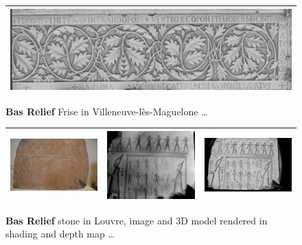 \begin{figure}
\begin{tabular}{||c|c|c|c||}
   \multicolumn{4}{|c|}{\vspace{2mm} \includegraphics[width=160mm]{FIGS/SAMPLES/FrisScaledShade.jpg}} \\ \hline  \hline
\end{tabular}
\caption{{\bf Bas Relief} Frise in Villeneuve-lès-Maguelone \dots}
\end{figure}


\begin{figure}
\begin{tabular}{||c|c|c||}
   \hline \hline
   \includegraphics[width=52mm]{FIGS/SAMPLES/Hiero1_2908.JPG} &
   \includegraphics[width=52mm]{FIGS/SAMPLES/Hiero2_2908.JPG} &
   \includegraphics[width=52mm]{FIGS/SAMPLES/Hiero3_2908.JPG} \\ \hline  \hline
\end{tabular}
\caption{{\bf Bas Relief} stone in Louvre, image and 3D model rendered in shading and depth map \dots}
\end{figure}



